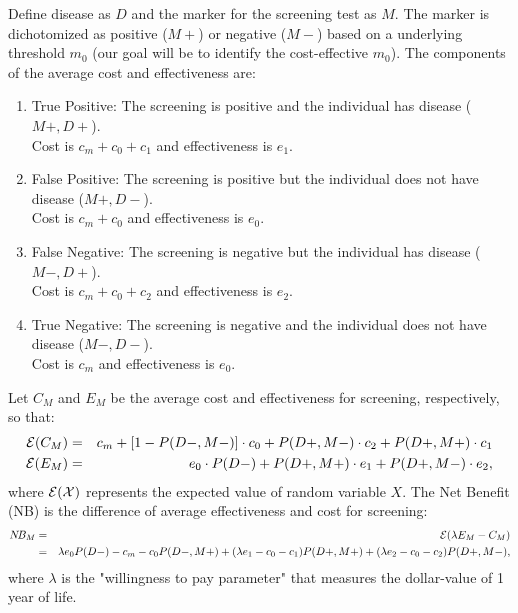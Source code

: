 \documentclass[AMA,STIX1COL]{WileyNJD-v2}
\begin{document}
Define disease as $D$ and the marker for the screening test as $M$.   The marker is dichotomized as positive ($M+$) or negative ($M-$) based on a underlying threshold $m_0$ (our goal will be to identify the cost-effective $m_0$).  The components of the average cost and effectiveness are:
\begin{enumerate}
			\item{True Positive: The screening is positive and the individual has disease ($M+,D+$). \\ Cost is $c_m+c_0+c_1$ and effectiveness is $e_1$.}
			\item{False Positive: The screening is positive but the individual does not have disease ($M+,D-$).  \\ Cost is $c_m+c_0$ and effectiveness is $e_0$.}
			\item{False Negative: The screening is negative but the individual has disease ($M-,D+$).  \\Cost is $c_m+c_0+c_2$ and effectiveness is $e_2$.}
			\item{True Negative: The screening is negative and the individual does not have disease ($M-,D-$).  \\ Cost is $c_m$ and effectiveness is $e_0$.}
\end{enumerate}
Let $C_M$ and $E_M$ be the average cost and effectiveness for screening, respectively, so that:
\begin{eqnarray*}
	{\cal E} (C_M) &=& c_m + [1-P(D-,M-)]\cdot c_0+P(D+,M-)\cdot c_2+P(D+,M+)\cdot c_1\\
	{\cal E} (E_M) &=& e_0\cdot P(D-) + P(D+,M+)\cdot e_1 + P(D+,M-)\cdot e_2,
\end{eqnarray*}
where ${\cal E(X)}$ represents the expected value of random variable $X$.  The Net Benefit (NB) is the difference of average effectiveness and cost for screening:
\begin{eqnarray}
	\label{eq:NB_M}
	N\!B_{M} &=& {\cal E} (\lambda E_M-C_M) \nonumber \\
				  &=&\lambda e_0P(D-) - c_m - c_0P(D-,M+) + (\lambda e_1-c_0-c_1)P(D+,M+) + (\lambda e_2-c_0-c_2)P(D+,M-),
\end{eqnarray}
where $\lambda$ is the "willingness to pay parameter" that measures the dollar-value of 1 year of life.
\end{document}
